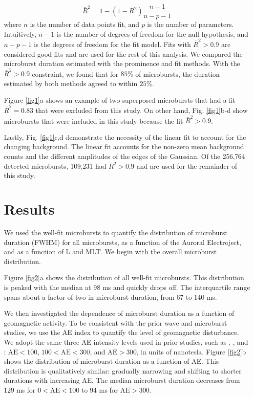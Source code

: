 \documentclass[draft]{agujournal2019}
\begin{document}
\begin{equation}
\bar{R}^2 = 1 - (1-R^2) \frac{n-1}{n-p-1}
\end{equation} where $n$ is the number of data points fit, and $p$ is the number of parameters. Intuitively, $n-1$ is the number of degrees of freedom for the null hypothesis, and $n-p-1$ is the degrees of freedom for the fit model. Fits with $\bar{R}^2 > 0.9$ are considered good fits and are used for the rest of this analysis. We compared the microburst duration estimated with the prominence and fit methods. With the $\bar{R}^2 > 0.9$ constraint, we found that for $85\%$ of microbursts, the duration estimated by both methods agreed to within $25\%$.

Figure \ref{fig1}a shows an example of two superposed microbursts that had a fit $\bar{R}^2 = 0.83$ that were excluded from this study. On other hand, Fig. \ref{fig1}b-d show microbursts that were included in this study because the fit $\bar{R}^2 > 0.9$.

Lastly, Fig. \ref{fig1}c,d demonstrate the necessity of the linear fit to account for the changing background. The linear fit accounts for the non-zero mean background counts and the different amplitudes of the edges of the Gaussian. Of the 256,764 detected microbursts, 109,231 had $R^2 > 0.9$ and are used for the remainder of this study.

\section{Results}\label{results}
We used the well-fit microbursts to quantify the distribution of microburst duration (FWHM) for all microbursts, as a function of the Auroral Electroject, and as a function of L and MLT. We begin with the overall microburst distribution.

Figure \ref{fig2}a shows the distribution of all well-fit microbursts. This distribution is peaked with the median at 98 ms and quickly drops off. The interquartile range spans about a factor of two in microburst duration, from 67 to 140 ms. 

We then investigated the dependence of microburst duration as a function of geomagnetic activity. To be consistent with the prior wave and microburst studies, we use the AE index to quantify the level of geomagnetic disturbance. We adopt the same three AE intensity levels used in prior studies, such as , , and : $\mathrm{AE} < 100$, $100 < \mathrm{AE} < 300$, and $\mathrm{AE} > 300$, in units of nanotesla. Figure \ref{fig2}b shows the distribution of microburst duration as a function of AE. This distribution is qualitatively similar: gradually narrowing and shifting to shorter durations with increasing AE. The median microburst duration decreases from 129 ms for $0 < \mathrm{AE} < 100$ to 94 ms for $ \mathrm{AE} > 300$.
\end{document}
